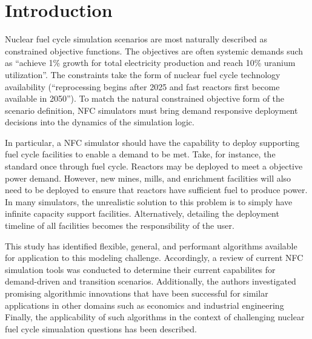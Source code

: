 \section{Introduction}
Nuclear fuel cycle simulation scenarios are most naturally described as 
constrained objective functions. The objectives are often systemic 
demands such as ``achieve 1\% growth for total electricity production 
and reach 10\% uranium utilization''. The constraints take 
the form of nuclear fuel cycle technology availability 
(``reprocessing begins after 2025 and fast reactors first become 
available in 2050''). To match the natural constrained objective form of the 
scenario definition, \gls{NFC} simulators must bring demand responsive 
deployment decisions into the dynamics of the simulation logic.  

In particular, a \gls{NFC} simulator should have the 
capability to deploy supporting fuel cycle facilities to enable 
a demand to be met. Take, for instance, the standard once through fuel 
cycle. Reactors may be deployed to meet a objective power demand. 
However, new mines, mills, and enrichment facilities will also need to be 
deployed to ensure that reactors have sufficient fuel to produce power.  
In many simulators, the unrealistic solution to this problem is to 
simply have infinite capacity support facilities. Alternatively, 
detailing the deployment timeline of all facilities becomes the 
responsibility of the user.

This study has identified flexible, general, and performant algorithms 
available for application to this modeling challenge.  Accordingly, a review 
of current \gls{NFC} simulation tools was conducted to determine their current 
capabilites for demand-driven and transition scenarios.  Additionally, the 
authors investigated promising algorithmic innovations that have been 
successful for similar applications in other domains such as economics and 
industrial engineering Finally, the applicability of such algorithms in the 
context of challenging nuclear fuel cycle simualation questions has been 
described.
